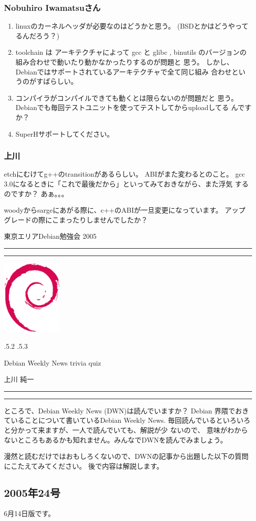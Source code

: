 \documentclass[mingoth]{jsarticle}
\makeatletter
\renewcommand{\section}{\@startsection{section}{1}{\z@}%
    {\Cvs \@plus.5\Cdp \@minus.2\Cdp}%
    {.5\Cvs \@plus.3\Cdp}%
    {\normalfont\Large\headfont\raggedright\centering}} %
\newcommand{\dancersection}[2]{%
\newpage
東京エリアDebian勉強会 2005
\hrule
\vspace{0.5mm}
\hrule
\hfill{}\includegraphics[width=3cm]{image200502/openlogo-nd.eps}\\
\vspace{-4cm}
\begin{center}
  \section{#1}
\end{center}
\hfill{}#2\hspace{3cm}\space\\
\hrule
\hrule
\vspace{1cm}
}
\makeatother
\begin{document}
\subsubsection{Nobuhiro Iwamatsuさん}

\begin{enumerate}
 \item  linuxのカーネルヘッダが必要なのはどうかと思う。
  (BSDとかはどうやってるんだろう？)

 \item  toolchain は アーキテクチャによって gcc と glibc , binutils
のバージョンの組み合わせで動いたり動かなかったりするのが問題と
思う。
しかし、Debianではサポートされているアーキテクチャで全て同じ組み
合わせというのがすばらしい。

 \item  コンパイラがコンパイルできても動くとは限らないのが問題だと
思う。Debianでも毎回テストユニットを使ってテストしてからuploadしてる
んですか？

 \item  SuperHサポートしてください。
\end{enumerate}


\subsubsection{上川}

etchにむけてg++のtransitionがあるらしい。
ABIがまた変わるとのこと。
gcc 3.0になるときに「これで最後だから」といってみておきながら、また浮気
するのですか？
あぁ。。。

woodyからsargeにあがる際に、c++のABIが一旦変更になっています。
アップグレードの際にこまったりしませんでしたか？

\dancersection{Debian Weekly News trivia quiz}{上川 純一}

ところで、Debian Weekly News (DWN)は読んでいますか？
Debian 界隈でおきていることについて書いているDebian Weekly News.
毎回読んでいるといろいろと分かって来ますが、一人で読んでいても、解説が少
ないので、
意味がわからないところもあるかも知れません。みんなでDWNを読んでみましょう。

漫然と読むだけではおもしろくないので、DWNの記事から出題した以下の質問にこたえてみてください。
後で内容は解説します。

\subsection{2005年24号}
6月14日版です。
\end{document}
